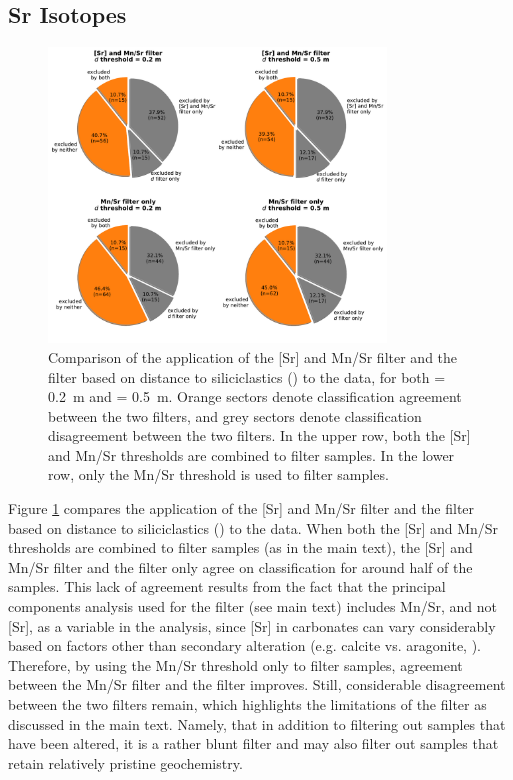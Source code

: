 \clearpage

\subsection{Sr Isotopes}

\begin{figure}[h!]
\begin{center}
	\includegraphics[width=0.8\textwidth]{figures/Tambien/filter-comparison.pdf}
	\caption{Comparison of the application of the [Sr] and Mn/Sr filter and the filter based on distance to siliciclastics (\dsil) to the \SrSr data, for both \dsil = 0.2~m and \dsil = 0.5~m. Orange sectors denote classification agreement between the two filters, and grey sectors denote classification disagreement between the two filters. In the upper row, both the [Sr] and Mn/Sr thresholds are combined to filter samples. In the lower row, only the Mn/Sr threshold is used to filter samples.}
	\label{fig:filter-comparison}
\end{center}
\end{figure}

Figure \ref{fig:filter-comparison} compares the application of the [Sr] and Mn/Sr filter and the filter based on distance to siliciclastics (\dsil) to the \SrSr data. When both the [Sr] and Mn/Sr thresholds are combined to filter samples (as in the main text), the [Sr] and Mn/Sr filter and the \dsil filter only agree on classification for around half of the samples. This lack of agreement results from the fact that the principal components analysis used for the \dsil filter (see main text) includes Mn/Sr, and not [Sr], as a variable in the analysis, since [Sr] in carbonates can vary considerably based on factors other than secondary alteration (e.g. calcite vs. aragonite, \citealp{Husson2015b}). Therefore, by using the Mn/Sr threshold only to filter samples, agreement between the Mn/Sr filter and the \dsil filter improves. Still, considerable disagreement between the two filters remain, which highlights the limitations of the \dsil filter as discussed in the main text. Namely, that in addition to filtering out samples that have been altered, it is a rather blunt filter and may also filter out samples that retain relatively pristine geochemistry.

